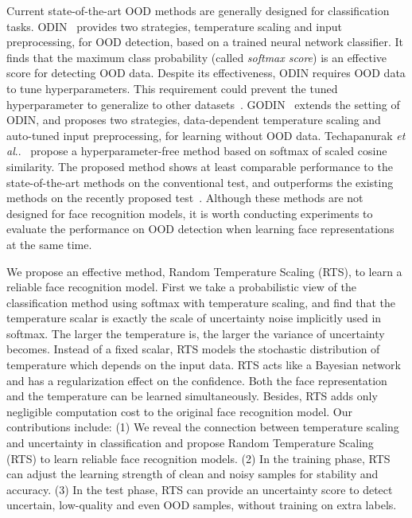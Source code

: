 \documentclass[letterpaper]{article} %
\makeatletter
\DeclareRobustCommand\onedot{\futurelet\@let@token\@onedot}
\def\@onedot{\ifx\@let@token.\else.\null\fi\xspace}
\def\etal{\emph{et al}\onedot}
\makeatother
\begin{document}
Current state-of-the-art OOD methods are generally designed for classification tasks. ODIN~\cite{liang2018enhancing} provides two strategies, temperature scaling and input preprocessing, for OOD detection, based on a trained neural network classifier. It finds that the maximum class probability (called \emph{softmax score}) is an effective score for detecting OOD data. Despite its effectiveness, ODIN requires OOD data to tune hyperparameters. This requirement could prevent the tuned hyperparameter to generalize to other datasets~\cite{shafaei2019less}. 
%
GODIN~\cite{hsu2020generalized} extends the setting of ODIN, and proposes two strategies, data-dependent temperature scaling and auto-tuned input preprocessing, for learning without OOD data.
%
Techapanurak \etal~\cite{techapanurak2019hyperparameter} propose a hyperparameter-free method based on softmax of scaled cosine similarity. The proposed method shows at least comparable performance to the state-of-the-art methods on the conventional test, and outperforms the existing methods on the recently proposed test~\cite{shafaei2019less}.
%
Although these methods are not designed for face recognition models, it is worth conducting experiments to evaluate the performance on OOD detection when learning face representations at the same time. 

We propose an effective method, Random Temperature Scaling (RTS), to learn a reliable face recognition model.
%
First we take a probabilistic view of the classification method using softmax with temperature scaling, and find that the temperature scalar is exactly the scale of uncertainty noise implicitly used in softmax. The larger the temperature is, the larger the variance of uncertainty becomes. 
%
Instead of a fixed scalar, RTS models the stochastic distribution of temperature which depends on the input data. RTS acts like a Bayesian network~\cite{gal2016dropout,theobald2021bayesian} and has a regularization effect on the confidence.
%
Both the face representation and the temperature can be learned simultaneously. Besides, RTS adds only negligible computation cost to the original face recognition model.
%
Our contributions include:
%
(1) We reveal the connection between temperature scaling and uncertainty in classification and propose Random Temperature Scaling (RTS) to learn reliable face recognition models.
%
(2) In the training phase, RTS can adjust the learning strength of clean and noisy samples for stability and accuracy. 
%
(3) In the test phase, RTS can provide an uncertainty score to detect uncertain, low-quality and even OOD samples, without training on extra labels. 
\end{document}
